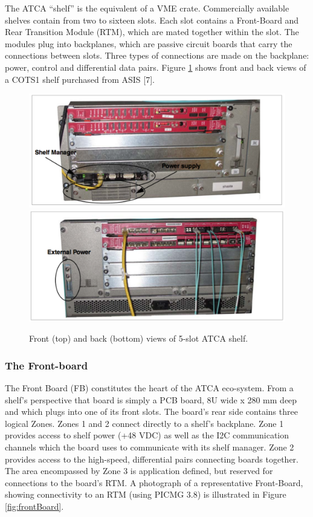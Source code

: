 The ATCA ``shelf'' is the equivalent of a VME crate. 
Commercially available shelves contain from two to sixteen slots. 
Each slot contains a Front-Board and Rear Transition Module (RTM),
which are mated together within the slot.
The modules plug into backplanes, which are passive circuit boards that
carry the connections between slots. 
Three types of connections are made on the backplane: 
power, control and differential data pairs. 
Figure \ref{fig:frontShelf} shows front and back views of a
 COTS1 shelf purchased from ASIS [7]. 

\begin{figure}[tbh]
\includegraphics[scale=0.6]{shelf-front.pdf}
\includegraphics[scale=0.6]{shelf-back.pdf}
\caption{Front (top) and back (bottom) views of 5-slot ATCA shelf.}
\label{fig:frontShelf}
\end{figure} 

\subsubsection{The Front-board}
\label{sec:frontboard}
The Front Board (FB) constitutes the heart of the ATCA eco-system. 
From a shelf's perspective that board is simply a PCB board, 
8U wide x 280 mm deep and which plugs into one of its front slots. 
The board's rear side contains three logical Zones.
Zones 1 and 2 connect directly to a shelf's backplane. 
Zone 1 provides access to shelf power (+48 VDC) as well as the
I2C communication channels which the board uses to communicate with its shelf manager. 
Zone 2 provides access to the high-speed, differential pairs connecting boards together. 
The area encompassed by Zone 3 is application defined, but reserved for connections 
to the board's RTM.
A photograph of a representative Front-Board, 
showing connectivity to an RTM (using PICMG 3.8) 
is illustrated in Figure \ref{fig:frontBoard}.

